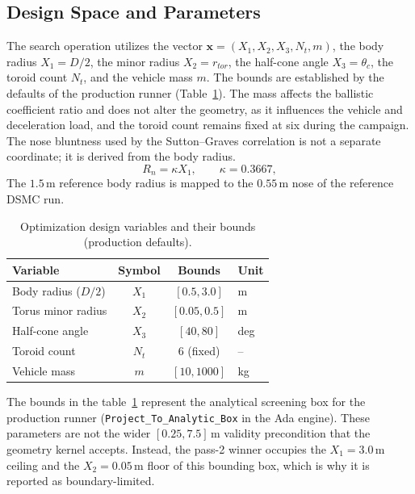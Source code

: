 \subsection{Design Space and Parameters}
The search operation utilizes the vector $\mathbf{x}=(X_1,X_2,X_3,N_t,m)$, the body radius $X_1=D/2$, the minor radius $X_2=r_{tor}$, the half-cone angle $X_3=\theta_c$, the toroid count $N_t$, and the vehicle mass $m$. The bounds are established by the defaults of the production runner (Table~\ref{tab:design_variables}). The mass affects the ballistic coefficient ratio and does not alter the geometry, as it influences the vehicle and deceleration load, and the toroid count remains fixed at six during the campaign. The nose bluntness used by the Sutton--Graves correlation is not a separate coordinate; it is derived from the body radius.
\begin{equation}
    R_n = \kappa X_1, \qquad \kappa = 0.3667,
    \label{eq:nose_ratio}
\end{equation}
The $1.5$\,m reference body radius is mapped to the $0.55$\,m nose of the reference DSMC run.

\begin{table}[H]
    \centering
    \caption{Optimization design variables and their bounds (production defaults).}
    \label{tab:design_variables}
    \begin{tabularx}{\textwidth}{|>{\RaggedRight\arraybackslash}p{}|c|c|X|}
        \hline
        \textbf{Variable} & \textbf{Symbol} & \textbf{Bounds} & \textbf{Unit} \\ \hline
        Body radius ($D/2$) & $X_1$ & $[0.5, 3.0]$ & m \\ \hline
        Torus minor radius & $X_2$ & $[0.05, 0.5]$ & m \\ \hline
        Half-cone angle & $X_3$ & $[40, 80]$ & deg \\ \hline
        Toroid count & $N_t$ & 6 (fixed) & -- \\ \hline
        Vehicle mass & $m$ & $[10, 1000]$ & kg \\ \hline
    \end{tabularx}
\end{table}
The bounds in the table~\ref{tab:design_variables} represent the analytical screening box for the production runner (\texttt{Project\_To\_Analytic\_Box} in the Ada engine). These parameters are not the wider $[0.25, 7.5]$\,m validity precondition that the geometry kernel accepts. Instead, the pass-2 winner occupies the $X_1=3.0$\,m ceiling and the $X_2=0.05$\,m floor of this bounding box, which is why it is reported as boundary-limited.

